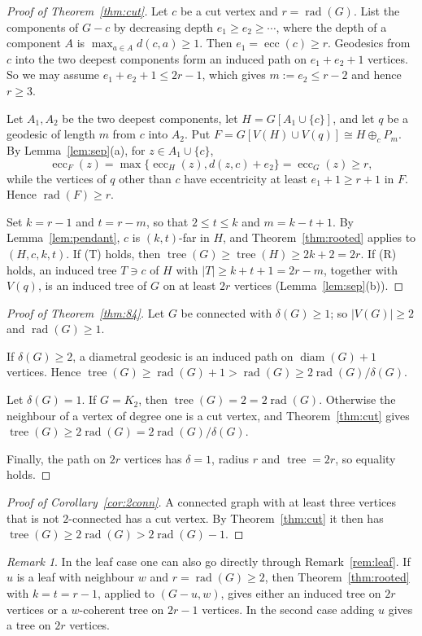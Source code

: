 \documentclass[11pt,a4paper]{article}
\theoremstyle{remark}
\newtheorem{remark}[theorem]{Remark}
\newcommand{\rad}{\operatorname{rad}}
\newcommand{\diam}{\operatorname{diam}}
\newcommand{\ecc}{\operatorname{ecc}}
\newcommand{\tr}{\tree}
\newcommand{\plus}{\oplus}
\newcommand{\tree}{\operatorname{tree}}
\begin{document}
\begin{proof}[Proof of Theorem~\ref{thm:cut}]
Let $c$ be a cut vertex and $r=\rad(G)$. List the components of $G-c$ by decreasing depth $e_1\ge e_2\ge\cdots$, where the depth of a component $A$ is $\max_{a\in A}d(c,a)\ge1$. Then $e_1=\ecc(c)\ge r$. Geodesics from $c$ into the two deepest components form an induced path on $e_1+e_2+1$ vertices. So we may assume $e_1+e_2+1\le 2r-1$, which gives $m:=e_2\le r-2$ and hence $r\ge3$.

Let $A_1,A_2$ be the two deepest components, let $H=G[A_1\cup\{c\}]$, and let $q$ be a geodesic of length $m$ from $c$ into $A_2$. Put $F=G[V(H)\cup V(q)]\cong H\plus_c P_m$. By Lemma~\ref{lem:sep}(a), for $z\in A_1\cup\{c\}$,
\[
\ecc_F(z)=\max\{\ecc_H(z),d(z,c)+e_2\}=\ecc_G(z)\ge r,
\]
while the vertices of $q$ other than $c$ have eccentricity at least $e_1+1\ge r+1$ in $F$. Hence $\rad(F)\ge r$.

Set $k=r-1$ and $t=r-m$, so that $2\le t\le k$ and $m=k-t+1$. By Lemma~\ref{lem:pendant}, $c$ is $(k,t)$-far in $H$, and Theorem~\ref{thm:rooted} applies to $(H,c,k,t)$. If (T) holds, then $\tr(G)\ge\tr(H)\ge 2k+2=2r$. If (R) holds, an induced tree $T\ni c$ of $H$ with $|T|\ge k+t+1=2r-m$, together with $V(q)$, is an induced tree of $G$ on at least $2r$ vertices (Lemma~\ref{lem:sep}(b)).
\end{proof}

\begin{proof}[Proof of Theorem~\ref{thm:84}]
Let $G$ be connected with $\delta(G)\ge1$; so $|V(G)|\ge2$ and $\rad(G)\ge1$.

If $\delta(G)\ge2$, a diametral geodesic is an induced path on $\diam(G)+1$ vertices. Hence $\tr(G)\ge\rad(G)+1>\rad(G)\ge 2\rad(G)/\delta(G)$.

Let $\delta(G)=1$. If $G=K_2$, then $\tr(G)=2=2\rad(G)$. Otherwise the neighbour of a vertex of degree one is a cut vertex, and Theorem~\ref{thm:cut} gives $\tr(G)\ge2\rad(G)=2\rad(G)/\delta(G)$.

Finally, the path on $2r$ vertices has $\delta=1$, radius $r$ and $\tr=2r$, so equality holds.
\end{proof}

\begin{proof}[Proof of Corollary~\ref{cor:2conn}]
A connected graph with at least three vertices that is not $2$-connected has a cut vertex. By Theorem~\ref{thm:cut} it then has $\tr(G)\ge2\rad(G)>2\rad(G)-1$.
\end{proof}

\begin{remark}
In the leaf case one can also go directly through Remark~\ref{rem:leaf}. If $u$ is a leaf with neighbour $w$ and $r=\rad(G)\ge2$, then Theorem~\ref{thm:rooted} with $k=t=r-1$, applied to $(G-u,w)$, gives either an induced tree on $2r$ vertices or a $w$-coherent tree on $2r-1$ vertices. In the second case adding $u$ gives a tree on $2r$ vertices.
\end{remark}
\end{document}
